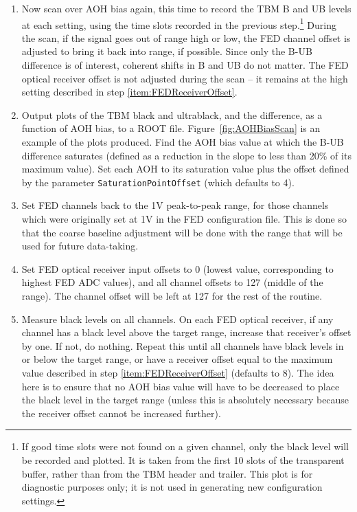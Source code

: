 \begin{enumerate}
\item Now scan over AOH bias again, this time to record the TBM B and UB levels at each setting, using the time slots recorded in the previous step.\footnote{If good time slots were not found on a given channel, only the black level will be recorded and plotted.  It is taken from the first 10 slots of the transparent buffer, rather than from the TBM header and trailer.  This plot is for diagnostic purposes only; it is not used in generating new configuration settings.} During the scan, if the signal goes out of range high or low, the FED channel offset is adjusted to bring it back into range, if possible.  Since only the B-UB difference is of interest, coherent shifts in B and UB do not matter.  The FED optical receiver offset is not adjusted during the scan -- it remains at the high setting described in step \ref{item:FEDReceiverOffset}.
\item Output plots of the TBM black and ultrablack, and the difference, as a function of AOH bias, to a ROOT file.  Figure~\ref{fig:AOHBiasScan} is an example of the plots produced.  Find the AOH bias value at which the B-UB difference saturates (defined as a reduction in the slope to less than 20\% of its maximum value).  Set each AOH to its saturation value plus the offset defined by the parameter \verb|SaturationPointOffset| (which defaults to 4).
\item Set FED channels back to the 1V peak-to-peak range, for those channels which were originally set at 1V in the FED configuration file.  This is done so that the coarse baseline adjustment will be done with the range that will be used for future data-taking.
\item Set FED optical receiver input offsets to 0 (lowest value, corresponding to highest FED ADC values), and all channel offsets to 127 (middle of the range).  The channel offset will be left at 127 for the rest of the routine.
\item Measure black levels on all channels.  On each FED optical receiver, if any channel has a black level above the target range, increase that receiver's offset by one.  If not, do nothing.  Repeat this until all channels have black levels in or below the target range, or have a receiver offset equal to the maximum value described in step \ref{item:FEDReceiverOffset} (defaults to 8).  The idea here is to ensure that no AOH bias value will have to be decreased to place the black level in the target range (unless this is absolutely necessary because the receiver offset cannot be increased further).

\end{enumerate}
